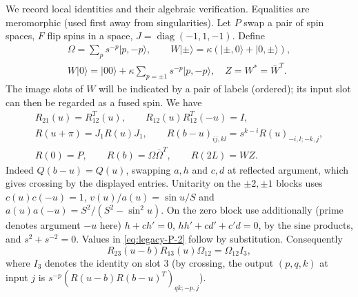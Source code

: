 We record local identities and their algebraic verification. Equalities are meromorphic (used first away from singularities). Let $P$ swap a pair of spin spaces, $F$ flip spins in a space, $J=\operatorname{diag}(-1,1,-1)$. Define
\[
 \begin{gathered}
 \Omega=\sum_p s^{-p}|p,-p\rangle,\qquad
 W|\pm\rangle=\kappa(|\pm,0\rangle+|0,\pm\rangle),\\
 W|0\rangle=|00\rangle+\kappa\sum_{p=\pm1}s^{-p}|p,-p\rangle,\quad Z=W^*=\bar W^T.
 \end{gathered}
\]
The image slots of $W$ will be indicated by a pair of labels (ordered); its input slot can then be regarded as a fused spin. We have
\begin{equation}
\begin{gathered}
 R_{21}(u)=R_{12}^T(u),\qquad R_{12}(u)R_{12}^T(-u)=I,\\
 R(u+\pi)=J_1 R(u)J_1,\qquad
 R(b-u)_{ij,kl}=s^{k-i}R(u)_{-i,l;-k,j},\\
 R(0)=P,\qquad R(b)=\Omega\bar\Omega^T,\qquad R(2L)=W Z.
\end{gathered}                                                   \label{eq:legacy-P-2}
\end{equation}
Indeed $Q(b-u)=Q(u)$, swapping $a,h$ and $c,d$ at reflected argument, which gives crossing by the displayed entries. Unitarity on the $\pm2,\pm1$ blocks uses $c(u)c(-u)=1$, $v(u)/a(u)=\sin u/S$ and $a(u)a(-u)=S^2/(S^2-\sin^2 u)$. On the zero block use additionally (prime denotes argument $-u$ here) $h+c h'=0$, $h h'+c d'+c' d=0$, by the sine products, and $s^2+s^{-2}=0$. Values in \eqref{eq:legacy-P-2} follow by substitution. Consequently
\[
 R_{23}(u-b)R_{13}(u)\Omega_{12}=\Omega_{12} I_3,
\]
where $I_3$ denotes the identity on slot 3 (by crossing, the output $(p,q,k)$ at input $j$ is $s^{-p}(R(u-b)R(b-u)^T)_{qk;-p,j}$).

